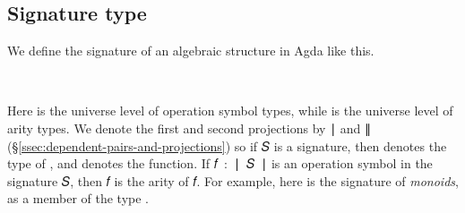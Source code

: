 \documentclass[a4paper,UKenglish,cleveref,autoref,thm-restate]{lipics-v2021}
\begin{document}
\subsection{Signature type}\label{signature-type}
We define the signature of an algebraic structure in Agda like this.
\ccpad
\begin{code}%
\>[0]\AgdaSpace{}%
\AgdaSymbol{:}\AgdaSpace{}%
\AgdaSymbol{(}\AgdaSpace{}%
\AgdaSpace{}%
\AgdaSymbol{:}\AgdaSpace{}%
\AgdaSymbol{)}\AgdaSpace{}%
\AgdaSpace{}%
\AgdaSymbol{(}\AgdaSpace{}%
\AgdaSpace{}%
\AgdaSymbol{)}\AgdaSpace{}%
\AgdaSpace{}%
\<%
\\
\>[0]\AgdaSpace{}%
\AgdaSpace{}%
\AgdaSpace{}%
\AgdaSymbol{=}\AgdaSpace{}%
\AgdaSpace{}%
\AgdaSpace{}%
\AgdaSpace{}%
\AgdaSpace{}%
\AgdaSpace{}%
\AgdaFunction{,}\AgdaSpace{}%
\AgdaSymbol{(}\AgdaSpace{}%
\AgdaSpace{}%
\AgdaSpace{}%
\AgdaSymbol{)}\<%
\end{code}
\ccpad
Here  is the universe level of operation symbol types, while  is the universe level of arity types. We denote the first and second projections by \ai ∣ and \ai ∥ (\S\ref{ssec:dependent-pairs-and-projections}) so if \ab 𝑆 is a signature, then  denotes the type of , and  denotes the  function. If \ab 𝑓~\as :~\af ∣~\ab 𝑆~\af ∣ is an operation symbol in the signature \ab 𝑆, then  \ab 𝑓 is the arity of \ab 𝑓. For example, %
here is the signature of \emph{monoids}, as a member of the type   .
\ccpad
\end{document}
